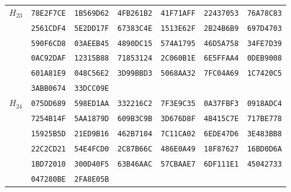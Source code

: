 \begin{table}
\begin{tabular}{@{}ccccccc@{}}
\midrule
\multirow{6}{*}{$H_{23}$}
 & \texttt{78E2F7CE} & \texttt{1B569D62} & \texttt{4FB261B2} & \texttt{41F71AFF} & \texttt{22437053} & \texttt{76A78C83}\\
 & \texttt{2561CDF4} & \texttt{5E2DD17F} & \texttt{67383C4E} & \texttt{1513E62F} & \texttt{2B24B6B9} & \texttt{697D4703}\\
 & \texttt{590F6CD8} & \texttt{03AEEB45} & \texttt{4890DC15} & \texttt{574A1795} & \texttt{46D5A758} & \texttt{34FE7D39}\\
 & \texttt{0AC92DAF} & \texttt{12315B88} & \texttt{71853124} & \texttt{2C060B1E} & \texttt{6E5FFAA4} & \texttt{0DEB9008}\\
 & \texttt{601A81E9} & \texttt{048C56E2} & \texttt{3D99BBD3} & \texttt{5068AA32} & \texttt{7FC04A69} & \texttt{1C7420C5}\\
 & \texttt{3ABB0674} & \texttt{33DCC09E}\\

\midrule
\multirow{6}{*}{$H_{24}$}
 & \texttt{075DD689} & \texttt{598ED1AA} & \texttt{332216C2} & \texttt{7F3E9C35} & \texttt{0A37FBF3} & \texttt{0918ADC4}\\
 & \texttt{7254B14F} & \texttt{5AA1879D} & \texttt{609B3C9B} & \texttt{3D676D8F} & \texttt{4B415C7E} & \texttt{717BE778}\\
 & \texttt{15925B5D} & \texttt{21ED9B16} & \texttt{462B7104} & \texttt{7C11CA02} & \texttt{6EDE47D6} & \texttt{3E483BB8}\\
 & \texttt{22C2CD21} & \texttt{54E4FCD0} & \texttt{2C87B66C} & \texttt{486E0A49} & \texttt{18F87627} & \texttt{16BD0D6A}\\
 & \texttt{1BD72010} & \texttt{300D40F5} & \texttt{63B46AAC} & \texttt{57CBAAE7} & \texttt{6DF111E1} & \texttt{45042733}\\
 & \texttt{047280BE} & \texttt{2FA8E05B}\\

\bottomrule
\end{tabular}
\end{table}

